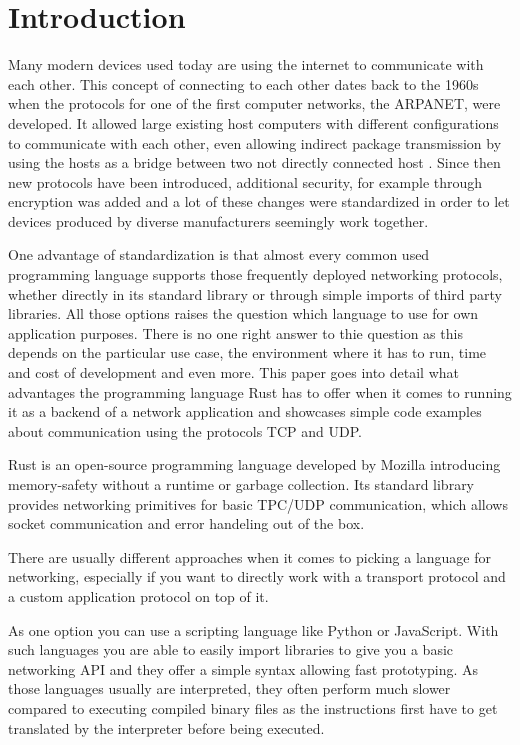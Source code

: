 
\section{Introduction}
Many modern devices used today are using the internet to communicate with each other. This concept of connecting to
each other dates back to the 1960s when the protocols for one of the first computer networks, the ARPANET, were
developed. It allowed large existing host computers with different configurations to communicate with each other, even
allowing indirect package transmission by using the hosts as a bridge between two not directly connected host
\cite{f70arpa}. Since then new protocols have been introduced, additional security, for example through encryption was
added and a lot of these changes were standardized in order to let devices produced by diverse manufacturers seemingly
work together.

One advantage of standardization is that almost every common used programming language supports those frequently
deployed networking protocols, whether directly in its standard library or through simple imports of third party
libraries. All those options raises the question which language to use for own application purposes. There is no one
right answer to thie question as this depends on the particular use case, the environment where it has to run, time and
cost of development and even more. This paper goes into detail what advantages the programming language Rust has to
offer when it comes to running it as a backend of a network application and showcases simple code examples about
communication using the protocols TCP and UDP.

Rust is an open-source programming language developed by Mozilla introducing memory-safety without a runtime or garbage
collection. Its standard library provides networking primitives for basic TPC/UDP communication, which allows socket
communication and error handeling out of the box. \cite{rust-language}

There are usually different approaches when it comes to picking a language for networking, especially if you want to
directly work with a transport protocol and a custom application protocol on top of it.

As one option you can use a scripting language like Python or JavaScript. With such languages you are able to easily
import libraries to give you a basic networking API and they offer a simple syntax allowing fast prototyping. As those
languages usually are interpreted, they often perform much slower compared to executing compiled binary files as the
instructions first have to get translated by the interpreter before being executed.

